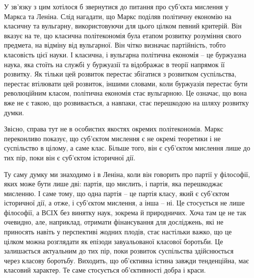 \documentclass[12pt,a4paper,openany]{book}
\begin{document}
У зв’язку з цим хотілося б звернутися до питання про суб’єкта мислення у Маркса та Леніна. Слід нагадати, що Маркс поділяв політичну економію на класичну та вульгарну, використовуючи для цього цілком певний критерій. Він вказує на те, що класична політекономія була етапом розвитку розуміння свого предмета, на відміну від вульгарної. Він чітко визначає партійність, тобто класовість цієї науки. І класична, і вульгарна політична економія – це буржуазна наука, яка стоїть на службі у буржуазії та відображає в теорії напрямок її розвитку. Як тільки цей розвиток перестає збігатися з розвитком суспільства, перестає втілювати цей розвиток, іншими словами, коли буржуазія перестає бути революційним класом, політична економія стає вульгарною. Це означає, що вона вже не є такою, що розвивається, а навпаки, стає перешкодою на шляху розвитку думки.

Звісно, справа тут не в особистих якостях окремих політекономів. Маркс переконливо показує, що суб’єктом мислення є не окремі теоретики і не суспільство в цілому, а саме клас. Більше того, він є суб’єктом мислення лише до тих пір, поки він є суб’єктом історичної дії.

Ту саму думку ми знаходимо і в Леніна, коли він говорить про партії у філософії, яких може бути лише дві: партія, що мислить, і партія, яка перешкоджає мисленню. І саме тому, що одна партія – це партія класу, який є суб’єктом історичної дії, а отже, і суб’єктом мислення, а інша – ні. Це стосується не лише філософії, а ВСІХ без винятку наук, зокрема й природничих. Хоча там це не так очевидно, але, наприклад, отримати фінансування для досліджень, які не приносять навіть у перспективі жодних плодів, стає настільки важко, що це цілком можна розглядати як епізоди завуальованої класової боротьби. Це залишається актуальним до тих пір, поки розвиток суспільства здійснюється через класову боротьбу. Виходить, що об’єктивна істина завжди тенденційна, має класовий характер. Те саме стосується об’єктивності добра і краси.
\end{document}
